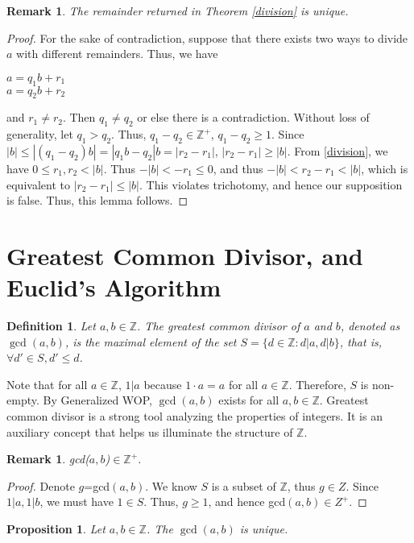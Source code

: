 \documentclass{article}
\newcommand{\Z}{\mathbb{Z}}
\newcommand{\FTSOC}{For the sake of contradiction}
\newcommand{\WLOG}{Without loss of generality}
\newtheorem{defn}[thm]{Definition}
\newtheorem{prop}[thm]{Proposition}
\newtheorem{rmk}[thm]{Remark}
\begin{document}
\begin{rmk}
\label{unique div}The remainder returned in Theorem \ref{division} is unique.
\end{rmk}
\begin{proof}
\FTSOC, suppose that there exists two ways to divide $a$ with different remainders. Thus, we have 
\begin{center}
    $a=q_{1}b+r_{1}$\\
    $a=q_{2}b+r_{2}$
\end{center}
 and $r_{1}\neq r_{2}$. Then $q_{1}\neq q_{2}$ or else there is a contradiction. \WLOG, let $q_{1}>q_{2}$. Thus, $q_{1}-q_{2}\in \Z^{+}$, $q_{1}-q_{2}\geq 1$. Since $|b|\leq |(q_{1}-q_{2})b|=|q_{1}b-q_{2}|b=|r_{2}-r_{1}|$, $|r_{2}-r_{1}|\geq |b|$. From \ref{division}, we have $0\leq r_{1},r_{2}<|b|$. Thus $-|b|<-r_{1}\leq 0$, and thus $-|b|<r_{2}-r_{1}<|b|$, which is equivalent to $|r_{2}-r_{1}|\leq |b|$. This violates trichotomy, and hence our supposition is false. Thus, this lemma follows. 
\end{proof}

\section{Greatest Common Divisor, and Euclid's Algorithm}
\begin{defn}
\label{gcd}
Let $a, b \in \Z$. The greatest common divisor of $a$ and $b$, denoted as $\gcd(a, b)$, is the maximal element of the set $S = \{d\in\Z:d|a, d|b\}$, that is, $\forall d'\in S, d'\leq d$.
\end{defn}

Note that for all $a\in\Z$, $1|a$ because $1\cdot a = a$ for all $a\in\Z$. Therefore, $S$ is non-empty. By Generalized WOP, $\gcd(a,b)$ exists for all $a,b\in\Z$. Greatest common divisor is a strong tool analyzing the properties of integers. It is an auxiliary concept that helps us illuminate the structure of $\Z$.

\begin{rmk}
\label{gcdpos}
gcd($a,b$)$\in \Z^+$.
\end{rmk}
\begin{proof}
Denote $g$=gcd$(a,b)$. We know $S$ is a subset of $\Z$, thus $g\in Z$. Since $1|a,1|b$, we must have $1\in S$. Thus, $g\geq 1$, and hence gcd$(a,b)\in Z^{+}$. 
\end{proof}


\begin{prop}
\label{gcd unique}
Let $a, b\in\Z$. The $\gcd(a,b)$ is unique.
\end{prop}
\end{document}
